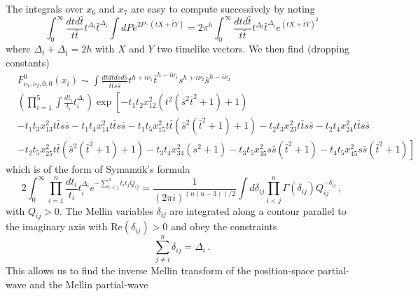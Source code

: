 The integrals over $x_6$ and $x_7$ are easy to compute successively by noting~\cite{Penedones:2010ue}
\begin{equation}
  \int_{0}^{\infty} \frac{dt d\bar{t}}{t \bar{t}} t^{\Delta_t} \bar{t}^{\Delta_{\bar{t}}} \int dP e^{2 P\cdot (t X+ \bar{t} Y)} = 2 \pi^{h}\int_{0}^{\infty} \frac{dt d\bar{t}}{t \bar{t}} t^{\Delta_t}\bar{t}^{\Delta_{\bar{t}}} e^{(t X+ \bar{t} Y)^2}
\end{equation}
where $\Delta_{t}+\Delta_{\bar{t}}= 2h$ with $X$ and $Y$ two timelike vectors.
We then find (dropping constants)
\begin{align}
   & F_{\nu_1, \nu_2,0,0}^{0}(x_i)\sim \int \frac{dt d\bar{t} ds d\bar{s}}{t\bar{t} s \bar{s}}t^{h+i \nu_1} \bar{t}^{h-i\nu_1} s^{h+i\nu_2} \bar{s}^{h-i\nu_2}
 \nonumber\\  
   &\left(\prod_{i=1}^{5}\int\frac{dt_i}{t_i} t_i^{\Delta_i}\right) \exp\left[-t_1 t_2 x_{12}^2 \left(t^2 \left(\bar{s}^2 \bar{t}^2+1\right)+1\right)\right.\nonumber \\
   & \left.-t_1 t_3 x_{13}^2 t\bar{t} s \bar{s}-t_1 t_4 x_{14}^2 t \bar{t} s \bar{s}- t_1 t_5 x_{15}^2 t \bar{t}
  \left(\bar{s}^2 \left(\bar{t}^2+1\right)+1\right)- t_2 t_3 x_{23}^2 t \bar{t} s \bar{s}-t_2 t_4 x_{24}^2 t  \bar{t} s \bar{s}\right.\nonumber                                                                                                                                                                               \\
   & \left.-t_2 t_5 x_{25}^2 t \bar{t} \left(\bar{s}^2
    \left(\bar{t}^2+1\right)+1\right)-t_3 t_4 x_{34}^2 \left(s^2+1\right)- t_3 t_5 x_{35}^2 s
    \bar{s} \left(\bar{t}^2+1\right)- t_4 t_5  x_{45}^2 s \bar{s} \left(\bar{t}^2+1\right)\right]
\end{align}
which is of the form of Symanzik's formula~\cite{Symanzik:1972wj}
\begin{equation}
  \label{eq:symanzikformula}
  2\int_{0}^{\infty}\prod_{i=1}^{n}\frac{dt_i}{t_i}t_i^{\Delta_i}e^{-\sum_{i<j}^{n} t_i t_j Q_{ij}}=\frac{1}{(2\pi i)^{(n(n-3))/2}}\int d\delta_{ij}\prod_{i<j}^{n}\Gamma(\delta_{ij})Q_{ij}^{-\delta_{ij}}\,,
\end{equation}
with $Q_{ij}>0$. The Mellin variables $\delta_{ij}$ are integrated along a contour parallel to the imaginary axis with $\text{Re} (\delta_{ij})>0$ and obey the constraints
\begin{equation}
  \sum_{j\ne i}^{n}\delta_{ij}=\Delta_i\,.
\end{equation}
This allows us to find the inverse Mellin transform of the position-space partial-wave and the Mellin partial-wave
